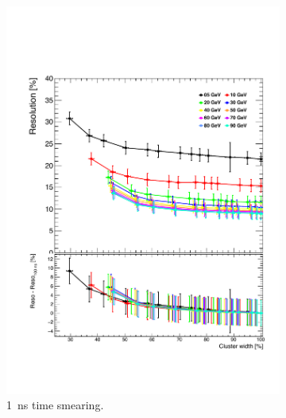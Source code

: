 \begin{figure}[htbp!]
\begin{minipage}{1\textwidth}
\begin{subfigure}[t]{0.5\textwidth}
      \includegraphics[width=1\linewidth]{chap6/fig_TimingILD/1ns_Smearing/ShowerWidth_Resolution_Smearing1ns}
      \vspace{-6ex}
      \caption{\SI{1}{\nano\second} time smearing.} \label{fig:WidthReso1ns}
    \end{subfigure}
  \end{minipage}
  \begin{subfigure}[t]{0.5\textwidth}
    \centering

\end{subfigure}
\end{figure}
